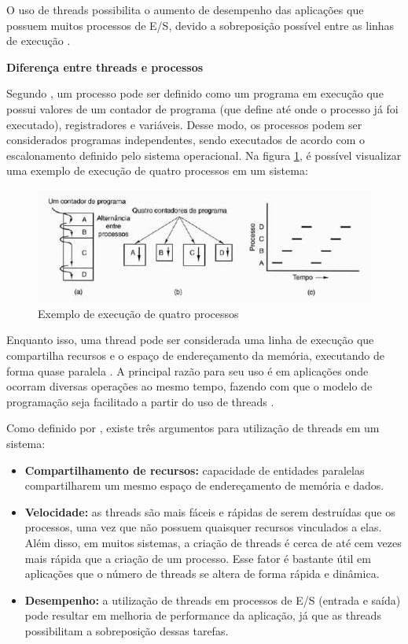 O uso de threads possibilita o aumento de desempenho das aplicações que possuem muitos processos de E/S, devido a sobreposição possível entre as linhas de execução \cite{tanenbaum2015modern}.

\textbf{Diferença entre threads e processos}

Segundo , um processo pode ser definido como um programa em execução que possui valores de um contador de programa (que define até onde o processo já foi executado), registradores e variáveis. Desse modo, os processos podem ser considerados programas independentes, sendo executados de acordo com o escalonamento definido pelo sistema operacional. Na figura \ref{fig:processos}, é possível visualizar uma exemplo de execução de quatro processos em um sistema:

\begin{figure}[H]
		\centering
		\includegraphics[width=1\linewidth]{imagens/processos.png}
		\caption[Exemplo de execução de quatro processos]{Exemplo de execução de quatro processos \cite{tanenbaum2015modern}}
		\label{fig:processos}
	\end{figure}

Enquanto isso, uma thread pode ser considerada uma linha de execução que compartilha recursos e o espaço de endereçamento da memória, executando de forma quase paralela \cite{tanenbaum2015modern}. A principal razão para seu uso é em aplicações onde ocorram diversas operações ao mesmo tempo, fazendo com que o modelo de programação seja facilitado a partir do uso de threads \cite{tanenbaum2015modern}.

Como definido por , existe três argumentos para utilização de threads em um sistema:

\begin{itemize}
    \item \textbf{Compartilhamento de recursos:} capacidade de entidades paralelas compartilharem um mesmo espaço de endereçamento de memória e dados.
    \item \textbf{Velocidade:} as threads são mais fáceis e rápidas de serem destruídas que os processos, uma vez que não possuem quaisquer recursos vinculados a elas. Além disso, em muitos sistemas, a criação de threads é cerca de até cem vezes mais rápida que a criação de um processo. Esse fator é bastante útil em aplicações que o número de threads se altera de forma rápida e dinâmica.
    \item \textbf{Desempenho:} a utilização de threads em processos de E/S (entrada e saída) pode resultar em melhoria de performance da aplicação, já que as threads possibilitam a sobreposição dessas tarefas. 
\end{itemize}

